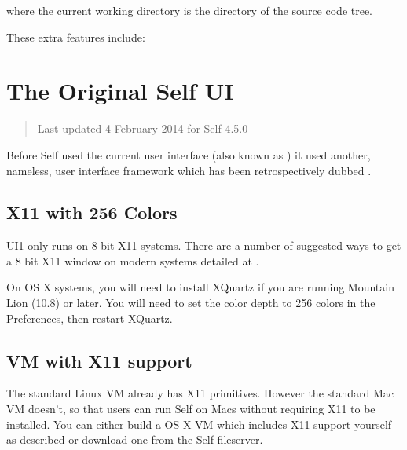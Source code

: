 \documentclass[letterpaper,10pt,english]{sphinxmanual}
\begin{document}
\begin{sphinxVerbatim}[commandchars=\\\{\}]
    
\end{sphinxVerbatim}

where the current working directory is the  directory of the source code tree.

These extra features include:


\section{The Original Self UI}
\label{\detokenize{ui1:the-original-self-ui}}\label{\detokenize{ui1::doc}}\begin{quote}

Last updated 4 February 2014 for Self 4.5.0
\end{quote}

Before Self used the current  user interface (also known as ) it used another, nameless, user interface framework which has been retrospectively dubbed .


\subsection{X11 with 256 Colors}
\label{\detokenize{ui1:x11-with-256-colors}}
UI1 only runs on 8 bit X11 systems. There are a number of suggested ways to get a 8 bit X11 window on modern systems detailed at .

On OS X systems, you will need to install XQuartz if you are running Mountain Lion (10.8) or later.  You will need to set the color depth to 256 colors in the Preferences, then restart XQuartz.


\subsection{VM with X11 support}
\label{\detokenize{ui1:xquartz}}\label{\detokenize{ui1:vm-with-x11-support}}
The standard Linux VM already has X11 primitives. However the standard Mac VM doesn't, so that users can run Self on Macs without requiring X11 to be installed. You can either build a OS X VM which includes X11 support yourself as described {\hyperref[\detokenize{buildvm::doc}]{}} or download one from the Self fileserver.
\end{document}
